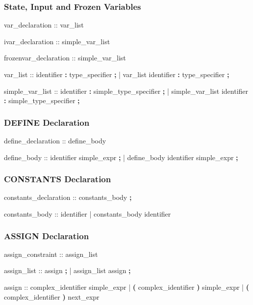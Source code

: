 \subsubsection{State, Input and Frozen Variables}
\begin{Grammar}
var_declaration ::  var_list

ivar_declaration ::  simple_var_list

frozenvar_declaration ::  simple_var_list

var_list :: identifier \textbf{:} type_specifier \textbf{;} 
          | var_list identifier \textbf{:} type_specifier \textbf{;} 

simple_var_list :: identifier \textbf{:} simple_type_specifier \textbf{;} 
      | simple_var_list identifier \textbf{:} simple_type_specifier \textbf{;} 
\end{Grammar}


\subsubsection{DEFINE Declaration}
\begin{Grammar}
define_declaration ::  define_body

define_body :: identifier \operator{:=} simple_expr \textbf{;}
             | define_body identifier \operator{:=} simple_expr \textbf{;}
\end{Grammar}


\subsubsection{CONSTANTS Declaration}
\begin{Grammar}
constants_declaration ::  constants_body \textbf{;}

constants_body :: identifier 
             | constants_body  \operator{,} identifier
\end{Grammar}


\subsubsection{ASSIGN Declaration}
\begin{Grammar}
assign_constraint ::  assign_list

assign_list :: assign \textbf{;}
             | assign_list assign \textbf{;}

assign ::
    complex_identifier          \operator{:=} simple_expr
  |  \textbf{(} complex_identifier \textbf{)} \operator{:=} simple_expr
  |  \textbf{(} complex_identifier \textbf{)} \operator{:=} next_expr
\end{Grammar}


